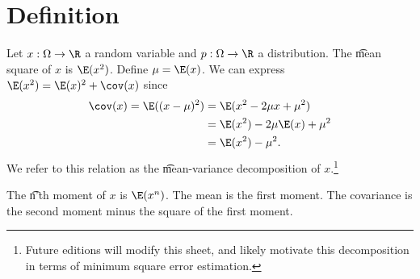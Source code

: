 

\section*{Definition}

Let $x: \Omega  \to \R $ a random variable and $p: \Omega  \to \R $ a distribution.
The \t{mean square} of $x$ is $\E (x^2)$.
Define $\mu  = \E (x)$.
We can express $\E (x^2) = \E (x)^2 + \cov(x)$ since
\[
\begin{aligned}
\cov(x) = \E ((x -\mu )^2)
&= \E (x^2 - 2\mu x + \mu ^2) \\
&= \E (x^2) -2\mu \E (x) + \mu ^2 \\
&= \E (x^2) - \mu ^2.
\end{aligned}
\]
We refer to this relation as the \t{mean-variance decomposition} of $x$.\footnote{Future editions will modify this sheet, and likely motivate this decomposition in terms of minimum square error estimation.}

The \t{n'th moment} of $x$ is $\E (x^n)$.
The mean is the first moment.
The covariance is the second moment minus the square of the first moment.

\blankpage